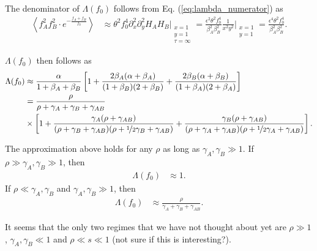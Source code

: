 \documentclass[11pt]{article}
\begin{document}
The denominator of $\Lambda(f_0)$ follows from Eq. (\ref{eq:lambda_numerator}) as 
\begin{align}
    \left\langle f_A^2f_B^2\cdot e^{-\frac{f_{A}+f_{B}}{f_0}}\right\rangle &\approx \theta^2 f_0^4 \partial_x^2 \partial_y^2 H_A H_B \Bigg\vert_{\substack{x=1 \\ y=1 \\ \tau=\infty}} = \frac{\epsilon^2 \theta^2 f_0^4}{\beta_A^2 \beta_B^2} \frac{1}{x^2y^2}\Bigg\vert_{\substack{x=1 \\ y=1}} = \frac{\epsilon^4 \theta^2 f_0^4}{\beta_A^2 \beta_B^2}.
\end{align}

$\Lambda(f_0)$ then follows as
\begin{align}\label{eq:lambda_strong_s}
    \Lambda(f_0) &\approx \frac{\alpha}{1+\beta_A + \beta_B} \left[1 +  \frac{2\beta_A(\alpha+\beta_A)}{(1+\beta_B)(2+\beta_B)}
    +\frac{2\beta_B(\alpha+\beta_B)}{(1+\beta_A)(2+\beta_A)}\right] \\\nonumber
    &= \frac{\rho}{\rho + \gamma_A + \gamma_B + \gamma_{AB}} \\\nonumber
  & \times \left[1 +\frac{\gamma_A(\rho + \gamma_{AB})}{(\rho + \gamma_B + \gamma_{AB})(\rho + \nicefrac{1}{2}\gamma_B + \gamma_{AB})} 
    +\frac{\gamma_B(\rho + \gamma_{AB})}{(\rho + \gamma_A + \gamma_{AB})(\rho + \nicefrac{1}{2}\gamma_A + \gamma_{AB})}\right].
\end{align}

The approximation above holds for any $\rho$ as long as $\gamma_{A}, \gamma_{B} \gg 1$. If $\rho \gg \gamma_A, \gamma_B \gg 1$, then 
\begin{align}
    \Lambda(f_0) &\approx 1.
\end{align}
If $\rho \ll \gamma_A, \gamma_B$ and $\gamma_A, \gamma_B \gg 1$, then
\begin{align}
    \Lambda(f_0) &\approx \frac{\rho}{\gamma_A + \gamma_B + \gamma_{AB}}.
\end{align}

It seems that the only two regimes that we have not thought about yet are $\rho \gg 1$, $\gamma_A, \gamma_B \ll 1$ and $\rho \ll s \ll 1$ (not sure if this is interesting?).
\end{document}
